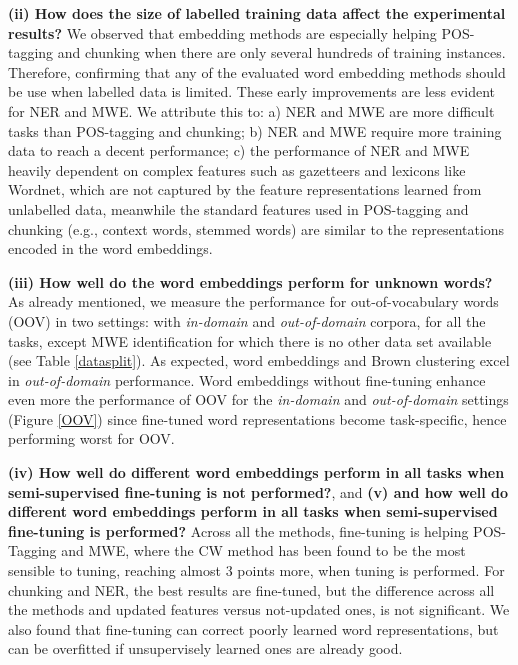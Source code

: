 \textbf{(ii) How does the size of labelled training data affect the experimental results?}
We observed that embedding methods are especially helping POS-tagging and chunking when there are only several hundreds of training instances. 
Therefore, confirming that any of the evaluated word embedding methods should be use when labelled data is limited.
These early improvements are less evident for NER and MWE. 
We attribute this to: a) NER and MWE are more difficult tasks than POS-tagging and chunking;
b) NER and MWE require more training data to reach a decent performance; c) the performance of NER and MWE heavily dependent on complex features such as gazetteers and lexicons like Wordnet, which are not captured by the feature representations learned from unlabelled data, meanwhile the standard features used in POS-tagging and chunking (e.g., context words, stemmed words) are similar to the representations encoded in the word embeddings.

\textbf{(iii) How well do the word embeddings perform for unknown words?}
As already mentioned, we measure the performance for out-of-vocabulary words (OOV)
in two settings: with \textit{in-domain} and \textit{out-of-domain} corpora, for all the tasks, except MWE identification for which there is no other data set available (see Table \ref{datasplit}).
As expected, word embeddings and Brown clustering excel in \textit{out-of-domain} performance.
Word embeddings without fine-tuning enhance even more the performance of OOV 
for the \textit{in-domain} and \textit{out-of-domain} settings (Figure \ref{OOV}) since fine-tuned
word representations become task-specific, hence performing worst for OOV.


\textbf{(iv) How well do different word embeddings perform in all tasks when semi-supervised fine-tuning is not performed?}, and 
\textbf{(v) and how well do different word embeddings perform in all tasks when semi-supervised fine-tuning is performed?}
Across all the methods, fine-tuning is helping POS-Tagging and MWE, where the CW method has been found to be the most sensible to tuning, reaching almost 3 points more, when tuning is performed. 
For chunking and NER, the best results are fine-tuned, but the difference across all the methods and updated features versus not-updated ones, is not significant. 
We also found that fine-tuning can correct poorly learned word representations, but can be
overfitted if unsupervisely learned ones are already good. 

